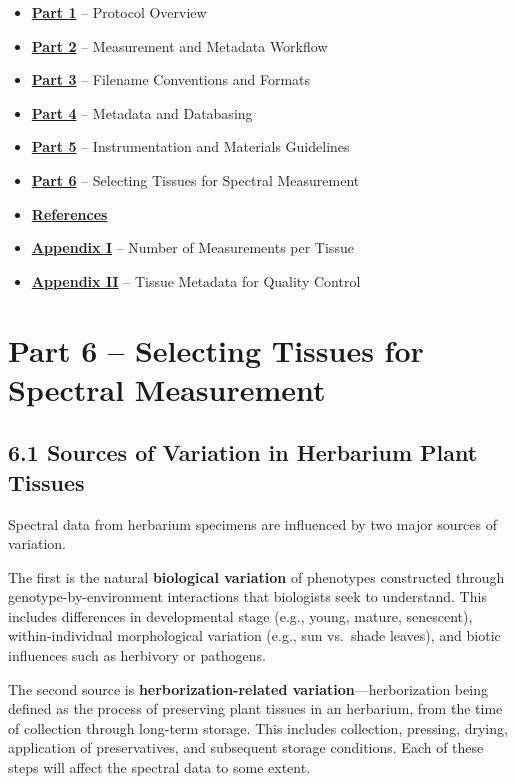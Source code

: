 \documentclass[
  letterpaper,
  DIV=11,
  numbers=noendperiod]{scrreprt}
\providecommand{\tightlist}{%
  \setlength{\itemsep}{0pt}\setlength{\parskip}{0pt}}
\begin{document}
\begin{itemize}
\tightlist
\item
  \hyperref[part1]{\textbf{Part 1}} -- Protocol Overview
\item
  \hyperref[part2]{\textbf{Part 2}} -- Measurement and Metadata Workflow
\item
  \hyperref[part3]{\textbf{Part 3}} -- Filename Conventions and Formats
\item
  \hyperref[part4]{\textbf{Part 4}} -- Metadata and Databasing
\item
  \hyperref[part5]{\textbf{Part 5}} -- Instrumentation and Materials
  Guidelines
\item
  \hyperref[part6]{\textbf{Part 6}} -- Selecting Tissues for Spectral
  Measurement
\item
  \hyperref[references]{\textbf{References}}
\item
  \hyperref[app1]{\textbf{Appendix I}} -- Number of Measurements per
  Tissue
\item
  \hyperref[app2]{\textbf{Appendix II}} -- Tissue Metadata for Quality
  Control
\end{itemize}


\chapter{Part 6 -- Selecting Tissues for Spectral
Measurement}\label{part-6-selecting-tissues-for-spectral-measurement}

\section{6.1 Sources of Variation in Herbarium Plant
Tissues}\label{part6}

Spectral data from herbarium specimens are influenced by two major
sources of variation.

The first is the natural \textbf{biological variation} of phenotypes
constructed through genotype-by-environment interactions that biologists
seek to understand. This includes differences in developmental stage
(e.g., young, mature, senescent), within-individual morphological
variation (e.g., sun vs.~shade leaves), and biotic influences such as
herbivory or pathogens.

The second source is \textbf{herborization-related
variation}---herborization being defined as the process of preserving
plant tissues in an herbarium, from the time of collection through
long-term storage. This includes collection, pressing, drying,
application of preservatives, and subsequent storage conditions. Each of
these steps will affect the spectral data to some extent.
\end{document}
